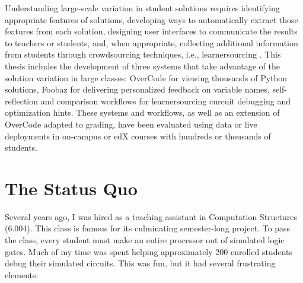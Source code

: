 Understanding large-scale variation in student solutions requires identifying appropriate features of solutions, developing ways to automatically extract those features from each solution, designing user interfaces to communicate the results to teachers or students, and, when appropriate, collecting additional information from students through crowdsourcing techniques, i.e., learnersourcing \cite{kim2013learnersourcing}. This thesis includes the development of three systems that take advantage of the solution variation in large classes: OverCode for viewing thousands of Python solutions, Foobaz for delivering personalized feedback on variable names, self-reflection and comparison workflows for learnersourcing curcuit debugging and optimization hints. These systems and workflows, as well as an extension of OverCode adapted to grading, have been evaluated using data or live deployments in on-campus or edX courses with hundreds or thousands of students.


\section{The Status Quo}

Several years ago, I was hired as a teaching assistant in Computation Structures (6.004). This class is famous for its culminating semester-long project. To pass the class, every student must make an entire processor out of simulated logic gates. Much of my time was spent helping approximately 200 enrolled students debug their simulated circuits. This was fun, but it had several frustrating elements:

